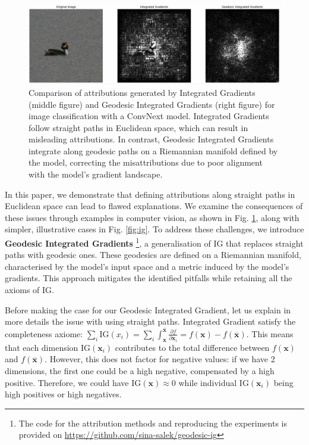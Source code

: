 \begin{figure}[t!]
	\begin{center}
		\centerline{\includegraphics[width=0.95\columnwidth]{figures/voc_compare.png}}
		\caption{Comparison of attributions generated by Integrated Gradients (middle figure) and Geodesic Integrated Gradients (right figure) for image classification with a ConvNext model. Integrated Gradients follow straight paths in Euclidean space, which can result in misleading attributions. In contrast, Geodesic Integrated Gradients integrate along geodesic paths on a Riemannian manifold defined by the model, correcting the misattributions due to poor alignment with the model's gradient landscape.}
		\label{fig:duck}
	\end{center}
	\vskip -0.3in
\end{figure}

In this paper, we demonstrate that defining attributions along straight paths in Euclidean space can lead to flawed explanations. We examine the consequences of these issues through examples in computer vision, as shown in Fig. \ref{fig:duck}, along with simpler, illustrative cases in Fig. \ref{fig:ig}. To address these challenges, we introduce \textbf{Geodesic Integrated Gradients} \footnote{The code for the attribution methods and reproducing the experiments is provided on \href{https://github.com/sina-salek/geodesic-ig}{https://github.com/sina-salek/geodesic-ig}}, a generalisation of IG that replaces straight paths with geodesic ones. These geodesics are defined on a Riemannian manifold, characterised by the model's input space and a metric induced by the model's gradients. This approach mitigates the identified pitfalls while retaining all the axioms of IG.

Before making the case for our Geodesic Integrated Gradient, let us explain in more details the issue with using straight paths. Integrated Gradient satisfy the completeness axiome: $\sum_i{\text{IG}(x_i)} = \sum_i{\int_{\textbf{x}}^{\overline{\textbf{x}}} \frac{\partial f}{\partial \textbf{x}_i}} = f(\textbf{x}) - f(\overline{\textbf{x}})$. This means that each dimension $\text{IG}(\textbf{x}_i)$  contributes to the total difference between $f(\textbf{x})$ and $f(\overline{\textbf{x}})$. However, this does not factor for negative values: if we have 2 dimensions, the first one could be a high negative, compensated by a high positive. Therefore, we could have $\text{IG}(\textbf{x}) \approx 0$ while individual $\text{IG}(\textbf{x}_i)$ being high positives or high negatives.

